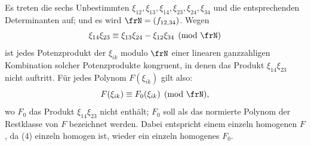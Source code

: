 \documentclass[11pt]{article}
\begin{document}
Es treten die sechs Unbestimmten \(\xi_{12},\xi_{13},\xi_{14},\xi_{23},\xi_{24},\xi_{34}\) und die entsprechenden Determinanten auf; und es wird \(\frN=(f_{12,34})\). Wegen
\begin{equation}
        \xi_{14}\xi_{23}\equiv \xi_{13}\xi_{24}-\xi_{12}\xi_{34}\pmod{\frN}
\end{equation}
ist jedes Potenzprodukt der \(\xi_{ik}\) modulo \(\frN\) einer linearen ganzzahligen Kombination solcher Potenzprodukte kongruent, in denen das Produkt \(\xi_{14}\xi_{23}\) nicht auftritt. Für jedes Polynom \(F(\xi_{ik})\) gilt also:
\begin{equation}
        F(\xi_{ik})\equiv F_0(\xi_{ik})\pmod{\frN},
\end{equation}
wo \(F_0\) das Produkt \(\xi_{14}\xi_{23}\) nicht enthält; \(F_0\) soll als das normierte Polynom der Restklasse von \(F\) bezeichnet werden. Dabei entspricht einem einzeln homogenen \(F\), da (4) einzeln homogen ist, wieder ein einzeln homogenes \(F_0\).
\end{document}
